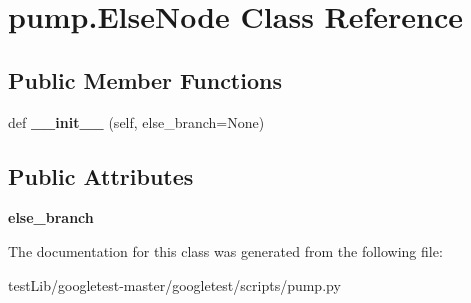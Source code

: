 \hypertarget{classpump_1_1ElseNode}{}\section{pump.\+Else\+Node Class Reference}
\label{classpump_1_1ElseNode}
\subsection*{Public Member Functions}
\begin{DoxyCompactItemize}
\item 
\mbox{\label{classpump_1_1ElseNode_a7489ff8c6c7ddfe6bd6593b8ecccd819}} 
def {\bfseries \+\_\+\+\_\+init\+\_\+\+\_\+} (self, else\+\_\+branch=None)
\end{DoxyCompactItemize}
\subsection*{Public Attributes}
\begin{DoxyCompactItemize}
\item 
\mbox{\label{classpump_1_1ElseNode_ac838a0fe9f5d713c7f56939eed5e128d}} 
{\bfseries else\+\_\+branch}
\end{DoxyCompactItemize}


The documentation for this class was generated from the following file\+:\begin{DoxyCompactItemize}
\item 
test\+Lib/googletest-\/master/googletest/scripts/pump.\+py\end{DoxyCompactItemize}
